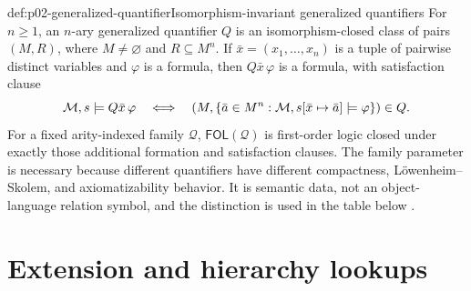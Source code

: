 \begin{hbdefinition}{def:p02-generalized-quantifier}{Isomorphism-invariant generalized quantifiers}
For \(n\geq1\), an \(n\)-ary generalized quantifier \(Q\) is an
isomorphism-closed class of pairs \((M,R)\), where \(M\ne\varnothing\) and
\(R\subseteq M^n\).  If \(\bar x=(x_1,\ldots,x_n)\) is a tuple of pairwise
distinct variables and \(\varphi\) is a
formula, then \(Q\bar x\,\varphi\) is a formula, with satisfaction clause
\[
 \mathcal M,s\models Q\bar x\,\varphi
 \quad\Longleftrightarrow\quad
 \left(M,
   \{\bar a\in M^n:\mathcal M,s[\bar x\mapsto\bar a]\models\varphi\}
 \right)\in Q.
\]
For a fixed arity-indexed family \(\mathcal Q\),
\(\mathsf{FOL}(\mathcal Q)\) is first-order logic closed under exactly those
additional formation and satisfaction clauses.  The family parameter is
necessary because different quantifiers have different compactness,
L\"owenheim--Skolem, and axiomatizability behavior.  It is semantic data, not
an object-language relation symbol, and the distinction is used in the table
below \cite{Mostowski1957,Lindstrom1966,Keisler1970}.
\end{hbdefinition}

\section{Extension and hierarchy lookups}
\label{sec:p02-extension-lookup}

